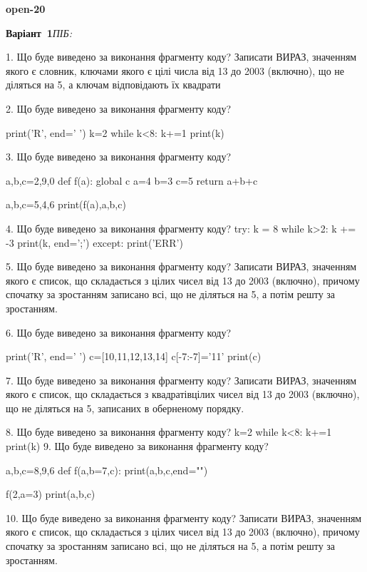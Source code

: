 \documentclass[11pt]{article}
\begin{document}
{\large\textbf{open-20}}

\textbf{Варіант \No\,1}\hfill \textit{ПІБ:}\,\underline{\hspace{60mm}}
\vspace{4mm}

1. Що буде виведено за виконання фрагменту коду?
Записати ВИРАЗ, значенням якого є словник, ключами якого є цілі числа від 13 до 2003 (включно), що не діляться на 5, а ключам відповідають їх квадрати 

2. Що буде виведено за виконання фрагменту коду?

print('R', end=' ')
k=2
while k<8:
    k+=1
print(k)


3. Що буде виведено за виконання фрагменту коду?

a,b,c=2,9,0
def f(a):
global c    a=4
    b=3
    c=5
    return a+b+c

a,b,c=5,4,6
print(f(a),a,b,c)

4. Що буде виведено за виконання фрагменту коду?
try:
    k = 8
    while k>2:
        k += -3
    print(k, end=';')
except:
    print('ERR')

5. Що буде виведено за виконання фрагменту коду?
Записати ВИРАЗ, значенням якого є список, що складається з цілих чисел від 13 до 2003 (включно), причому спочатку за зростанням записано всі, що не діляться на 5, а потім решту за зростанням.

6. Що буде виведено за виконання фрагменту коду?

print('R', end=' ')
c=[10,11,12,13,14]
c[-7:-7]='11'
print(c)


7. Що буде виведено за виконання фрагменту коду?
Записати ВИРАЗ, значенням якого є список, що складається з квадратівцілих чисел від 13 до 2003 (включно), що не діляться на 5, записаних в обернено\-му порядку.

8. Що буде виведено за виконання фрагменту коду?
k=2
   while k<8: k+=1
   print(k)
9. Що буде виведено за виконання фрагменту коду?

a,b,c=8,9,6
def f(a,b=7,c):
    print(a,b,c,end="")

f(2,a=3)
print(a,b,c)


10. Що буде виведено за виконання фрагменту коду?
Записати ВИРАЗ, значенням якого є список, що складається з цілих чисел від 13 до 2003 (включно), причому спочатку за зростанням записано всі, що не діляться на 5, а потім решту за зростанням.
\end{document}
